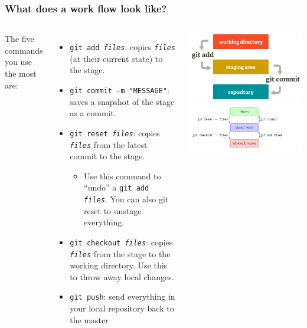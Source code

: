 \documentclass[hyperref={colorlinks=true}]{beamer}
\begin{document}
\begin{frame}%
  \frametitle{What does a \git work flow look like?}
  
  \begin{columns}
    
    
    The five commands you use the most are:
    
      \begin{itemize}
        \item \texttt{git add \textit{files}}: copies \texttt{\textit{files}} (at their current state) to the stage.
        \item \texttt{git commit -m "MESSAGE"}: saves a snapshot of the stage as a commit.
        \item \texttt{git reset \textit{files}}: copies \texttt{\textit{files}} from the latest commit to the stage. 
        \begin{itemize}
          \item Use this command to ``undo'' a \texttt{git add \textit{files}}. You can also git reset to unstage everything.
        \end{itemize}
        \item \texttt{git checkout \textit{files}}:  copies \texttt{\textit{files}} from the stage to the working directory. Use this to throw away local changes.
        \item \texttt{git push}: send everything in your local repository back to the master
      \end{itemize}
    
    
      \begin{center}
        \includegraphics[width=0.95\columnwidth]{GitStages.png}\\ 
        \vfill
        \includegraphics[width=1.25\columnwidth]{GitBasicUsage.png}
      \end{center}
    

\end{columns}
\end{frame}
\end{document}
